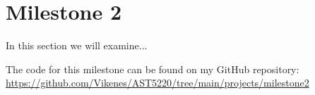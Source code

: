 \section{Milestone 2}\label{M2}
In this section we will examine...


The code for this milestone can be found on my GitHub repository: \url{https://github.com/Vikenes/AST5220/tree/main/projects/milestone2}





